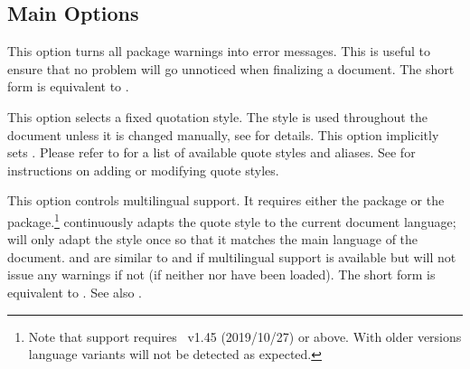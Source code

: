 \documentclass{ltxdockit}[2010/09/26]
\begin{document}
\subsection{Main Options}
\label{opt:opt}

\begin{optionlist}


This option turns all package warnings into error messages. This is useful to ensure that no problem will go unnoticed when finalizing a document. The short form  is equivalent to .


This option selects a fixed quotation style. The style is used throughout the document unless it is changed manually, see  for details. This option implicitly sets . Please refer to  for a list of available quote styles and aliases. See  for instructions on adding or modifying quote styles.


This option controls multilingual support. It requires either the  package or the  package.\footnote{Note that  support requires ~v1.45 (2019/10/27) or above. With older  versions language variants will not be detected as expected.}  continuously adapts the quote style to the current document language;  will only adapt the style once so that it matches the main language of the document.  and  are similar to  and  if multilingual support is available but will not issue any warnings if not (\ie if neither  nor  have been loaded). The short form  is equivalent to . See also .


\end{optionlist}
\end{document}
